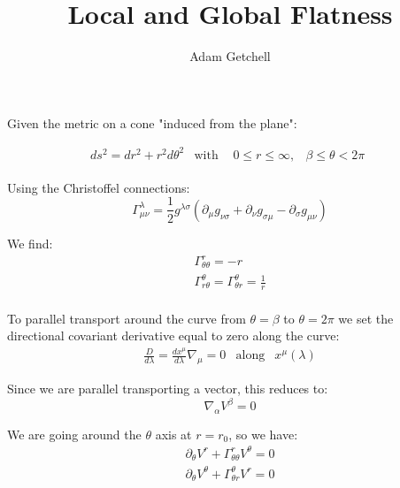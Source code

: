 \documentclass{article}
\title{Local and Global Flatness}
\author{Adam Getchell}
\date{}
\begin{document}
\maketitle


Given the metric on a cone "induced from the plane":

\begin{equation}
\begin{array}{rcl} ds^{2}=dr^{2}+r^{2}d\theta^{2} & \mbox{with} &  \begin{array}{cc}0\leqslant r\leqslant\infty, & \beta\leqslant\theta < 2\pi

\end{array}
\end{array}
\end{equation}

Using the Christoffel connections:
\begin{equation}
\Gamma_{\mu\nu}^{\lambda}=\frac{1}{2}g^{\lambda\sigma}\left(\partial_{\mu}g_{\nu\sigma}+\partial_{\nu}g_{\sigma\mu}-\partial_{\sigma}g_{\mu\nu}\right)
\end{equation}

We find:
\begin{equation}
\begin{array}{l}
\Gamma^{r}_{\theta\theta}=-r\\
\Gamma^{\theta}_{r\theta}=\Gamma^{\theta}_{\theta r}=\frac{1}{r}\\
\end{array}
\end{equation}

To parallel transport around the curve from $\theta=\beta$ to $\theta=2\pi$ we set the directional covariant derivative equal to zero along the curve:
\begin{equation}
\begin{array}{rcl} \frac{D}{d\lambda}=\frac{dx^{\mu}}{d\lambda}\nabla_{\mu}=0 & \mbox{along} & x^{\mu}\left(\lambda\right)
\end{array}
\end{equation}

Since we are parallel transporting a vector, this reduces to:
\begin{equation}
\nabla_{\alpha}V^{\beta}=0
\end{equation}

We are going around the $\theta$ axis at $r=r_{0}$, so we have:
\begin{equation}
\begin{array}{l}
\partial_{\theta}V^{r}+\Gamma^{r}_{\theta\theta}V^{\theta}=0 \\
\partial_{\theta}V^{\theta}+\Gamma^{\theta}_{\theta r}V^{r}=0
\end{array}
\end{equation}
\end{document}

